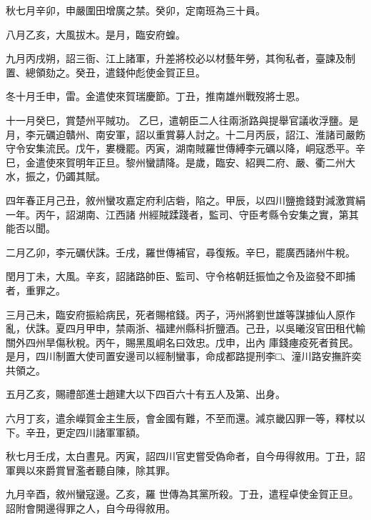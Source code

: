 \begin{pinyinscope}
 秋七月辛卯，申嚴圍田增廣之禁。癸卯，定南班為三十員。



 八月乙亥，大風拔木。是月，臨安府蝗。



 九月丙戌朔，詔三衙、江上諸軍，升差將校必以材藝年勞，其徇私者，臺諫及制置、總領劾之。癸丑，遣錢仲彪使金賀正旦。



 冬十月壬申，雷。金遣使來賀瑞慶節。丁丑，推南雄州戰歿將士恩。



 十一月癸巳，賞楚州平賊功。
 乙巳，遣朝臣二人往兩浙路與提舉官議收浮鹽。是月，李元礪迫贛州、南安軍，詔以重賞募人討之。十二月丙辰，詔江、淮諸司嚴飭守令安集流民。戊午，婁機罷。丙寅，湖南賊羅世傳縛李元礪以降，峒寇悉平。辛巳，金遣使來賀明年正旦。黎州蠻請降。是歲，臨安、紹興二府、嚴、衢二州大水，振之，仍蠲其賦。



 四年春正月己丑，敘州蠻攻嘉定府利店砦，陷之。甲辰，以四川鹽擔錢對減激賞絹一年。丙午，詔湖南、江西諸
 州經賊蹂踐者，監司、守臣考縣令安集之實，第其能否以聞。



 二月乙卯，李元礪伏誅。壬戌，羅世傳補官，尋復叛。辛巳，罷廣西諸州牛稅。



 閏月丁未，大風。辛亥，詔諸路帥臣、監司、守令格朝廷振恤之令及盜發不即捕者，重罪之。



 三月己未，臨安府振給病民，死者賜棺錢。丙子，沔州將劉世雄等謀據仙人原作亂，伏誅。夏四月甲申，禁兩浙、福建州縣科折鹽酒。己丑，以吳曦沒官田租代輸關外四州旱傷秋稅。丙午，賜黑風峒名曰效忠。戊申，出內
 庫錢瘞疫死者貧民。是月，四川制置大使司置安邊司以經制蠻事，命成都路提刑李□、潼川路安撫許奕共領之。



 五月乙亥，賜禮部進士趙建大以下四百六十有五人及第、出身。



 六月丁亥，遣余嶸賀金主生辰，會金國有難，不至而還。減京畿囚罪一等，釋杖以下。辛丑，更定四川諸軍軍額。



 秋七月壬戌，太白晝見。丙寅，詔四川官吏嘗受偽命者，自今毋得敘用。丁丑，詔軍興以來爵賞冒濫者聽自陳，除其罪。



 九月辛酉，敘州蠻寇邊。乙亥，羅
 世傳為其黨所殺。丁丑，遣程卓使金賀正旦。詔附會開邊得罪之人，自今毋得敘用。




\end{pinyinscope}
